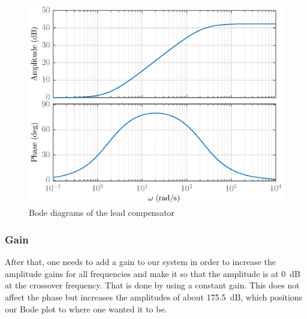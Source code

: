 \begin{figure}[H]
    \centering
    \includegraphics[scale = 0.8]{resources/eps/4-Val/glead.eps}
    \caption{Bode diagrams of the lead compensator}
    \label{fig:glead}
\end{figure}

\subsubsection{Gain}
After that, one needs to add a gain to our system in order to increase the amplitude gains for all frequencies and make it so that the amplitude is at \SI{0}{\deci\bel} at the crossover frequency. That is done by using a constant gain. This does not affect the phase but increases the amplitudes of about \SI{175.5}{\deci\bel}, which positions our Bode plot to where one wanted it to be. 

